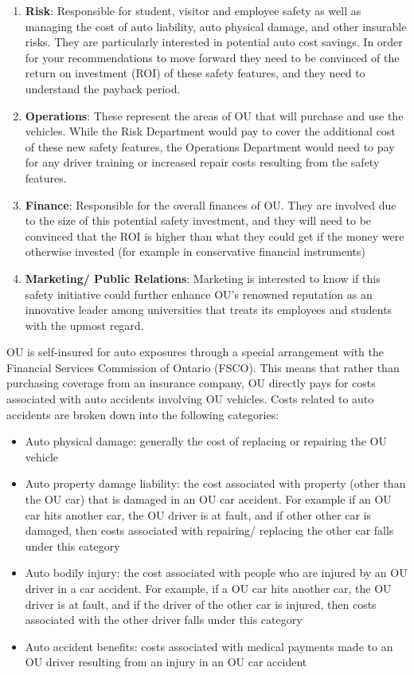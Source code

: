 \documentclass[12pt]{article}
\begin{document}
\begin{enumerate}
\item \textbf{Risk}: Responsible for student, visitor and employee safety as well as managing the cost of auto liability, auto physical damage, and other insurable risks. They are particularly interested in potential auto cost savings. In order for your recommendations to move forward they need to be convinced of the return on investment (ROI) of these safety features, and they need to understand the payback period.
\item \textbf{Operations}: These represent the areas of OU that will purchase and use the vehicles. While the Risk Department would pay to cover the additional cost of these new safety features, the Operations Department would need to pay for any driver training or increased repair costs resulting from the safety features.
\item \textbf{Finance}: Responsible for the overall finances of OU. They are involved due to the size of this potential safety investment, and they will need to be convinced that the ROI is higher than what they could get if the money were otherwise invested (for example in conservative financial instruments)
\item \textbf{Marketing/ Public Relations}: Marketing is interested to know if this safety initiative could further enhance OU's renowned reputation as an innovative leader among universities that treats its employees and students with the upmost regard.
\end{enumerate}

\medskip\noindent
OU is self-insured for auto exposures through a special arrangement with the Financial Services Commission of Ontario (FSCO). This means that rather than purchasing coverage from an insurance company, OU directly pays for costs associated with auto accidents involving OU vehicles. Costs related to auto accidents are broken down into the following categories:
%
\begin{itemize}
\item Auto physical damage: generally the cost of replacing or repairing the OU vehicle
\item Auto property damage liability: the cost associated with property (other than the OU car) that is damaged in an OU car accident. For example if an OU car hits another car, the OU driver is at fault, and if other other car is damaged, then costs associated with repairing/ replacing the other car falls under this category
\item Auto bodily injury: the cost associated with people who are injured by an OU driver in a car accident. For example, if a OU car hits another car, the OU driver is at fault, and if the driver of the other car is injured, then costs associated with the other driver falls under this category
\item Auto accident benefits: costs associated with medical payments made to an OU driver resulting from an injury in an OU car accident
\end{itemize}
\end{document}
